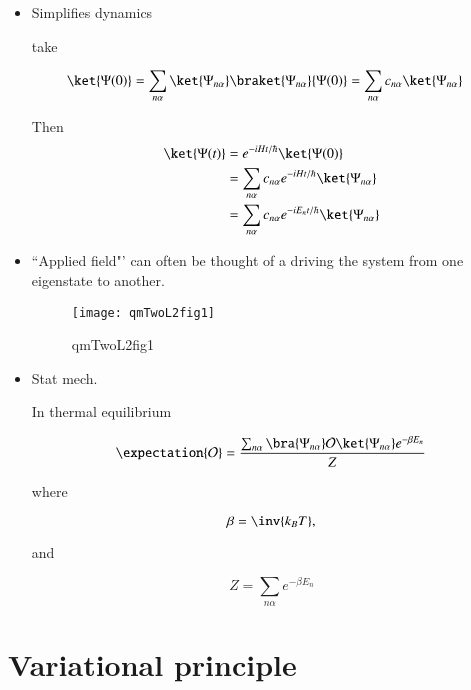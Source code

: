 \begin{itemize}
\item Simplifies dynamics

take

\begin{align*}
\ket{\Psi(0)}
= \sum_{n\alpha}
\ket{\Psi_{n \alpha}}
\braket{\Psi_{n \alpha}}{\Psi(0)}
&
= \sum_{n\alpha} c_{n \alpha} \ket{\Psi_{n \alpha}}
\end{align*}

Then
\begin{align*}
\ket{\Psi(t)}
&=
e^{-i H t/\hbar}
\ket{\Psi(0)} \\
&=
\sum_{n\alpha} c_{n \alpha}
e^{-i H t/\hbar}
\ket{\Psi_{n \alpha}}  \\
&=
\sum_{n\alpha} c_{n \alpha}
e^{-i E_n t/\hbar}
\ket{\Psi_{n \alpha}}
\end{align*}

\item ``Applied  field"' can often be thought of a driving the system from one eigenstate to another.

\begin{figure}[htp]
\centering
\texttt{[image: qmTwoL2fig1]}
\caption{qmTwoL2fig1}\label{fig:qmTwoL2:1}
\end{figure}

\item Stat mech.

In thermal equilibrium

\begin{equation}\label{eqn:qmTwoL2:30}
\expectation{\mathcal{O}} =
\frac{\sum_{n \alpha} \bra{\Psi_{n\alpha}} \mathcal{O} \ket{\Psi_{n \alpha}}  e^{-\beta E_n}}{
Z
}
\end{equation}

where

\begin{equation}\label{eqn:qmTwoL2:50}
\beta = \inv{k_B T},
\end{equation}

and

\begin{equation}\label{eqn:qmTwoL2:70}
Z = \sum_{n \alpha} e^{-\beta E_n}
\end{equation}
\end{itemize}

\section{Variational principle}

